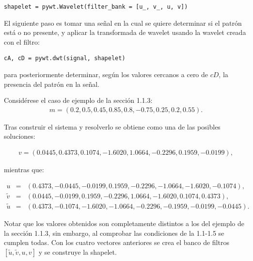 \begin{lstlisting}[caption=Creaci\'on de una wavelet a partir del banco de filtros]
shapelet = pywt.Wavelet(filter_bank = [u_, v_, u, v])
\end{lstlisting}

\par El siguiente paso es tomar una se\~nal en la cual se quiere determinar si el patr\'on est\'a o no presente, y aplicar la transformada de wavelet usando la wavelet creada con el filtro:\\

\begin{lstlisting}[caption=C\'alculo de la transformada discreta de Wavelet usando pywt]
cA, cD = pywt.dwt(signal, shapelet)
\end{lstlisting}

para posteriormente determinar, seg\'un los valores cercanos a cero de $cD$, la presencia del patr\'on en la se\~nal.

Consid\'erese el caso de ejemplo de la secci\'on 1.1.3:
\begin{eqnarray}
m=(0.2,0.5,0.45,0.85,0.8,-0.75,0.25,0.2,0.55).\nonumber
\end{eqnarray}

\par Tras construir el sistema y resolverlo se obtiene como una de las posibles soluciones:

\begin{eqnarray}
v=(0.0445, 0.4373, 0.1074, -1.6020, 1.0664, -0.2296, 0.1959, -0.0199),\nonumber
\end{eqnarray}

mientras que:

\begin{eqnarray}
u&=&(0.4373, -0.0445, -0.0199, 0.1959, -0.2296, -1.0664, -1.6020, -0.1074),\nonumber\\
\tilde{v}&=&(0.0445, -0.0199, 0.1959, -0.2296, 1.0664, -1.6020, 0.1074, 0.4373),\nonumber\\
\tilde{u}&=&(0.4373, -0.1074, -1.6020, -1.0664, -0.2296, -0.1959, -0.0199, -0.0445).\nonumber
\end{eqnarray}

\par Notar que los valores obtenidos son completamente distintos a los del ejemplo de la secci\'on 1.1.3, sin embargo, al comprobar las condiciones de la 1.1-1.5 se cumplen todas. Con los cuatro vectores anteriores se crea el banco de filtros $[\tilde{u},\tilde{v},u,v]$ y se construye la shapelet.\\

